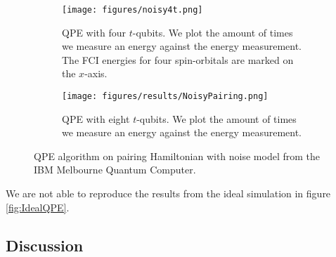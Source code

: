 \begin{figure}[H]
\begin{subfigure}{.5\textwidth}
  \centering
  \texttt{[image: figures/noisy4t.png]}  
  \caption{QPE with four $t$-qubits. We plot the amount of times we measure an energy against the energy measurement. The FCI energies for four spin-orbitals are marked on the $x$-axis.}
  \label{fig:NoisyQPE4tqubits}
\end{subfigure}
\begin{subfigure}{.5\textwidth}
  \centering
  \texttt{[image: figures/results/NoisyPairing.png]}  
  \caption{QPE with eight $t$-qubits. We plot the amount of times we measure an energy against the energy measurement.}
  \label{fig:NoisyQPE8tqubits}
\end{subfigure}
\caption{QPE algorithm on pairing Hamiltonian with noise model from the IBM Melbourne Quantum Computer.}
\label{fig:noisyQPE}
\end{figure}
We are not able to reproduce the results from the ideal simulation in figure \ref{fig:IdealQPE}.

\subsection{Discussion}
\label{subsec:QPEDiscussion}

